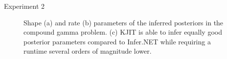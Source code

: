 \documentclass[english]{beamer}
\begin{document}
\begin{frame}
\begin{columns}[t]
\begin{block}{ Experiment 2}
\begin{figure}[ht]
  \centering
  \caption{Shape (a) and rate (b) parameters of the inferred posteriors in 
  the compound gamma problem. 
  (c) KJIT is able to infer equally good posterior parameters compared to Infer.NET 
  while requiring a runtime several orders of magnitude lower. }
  \label{fig:cg_performance}
\end{figure}




\end{block}
\end{columns}
\end{frame}
\end{document}
